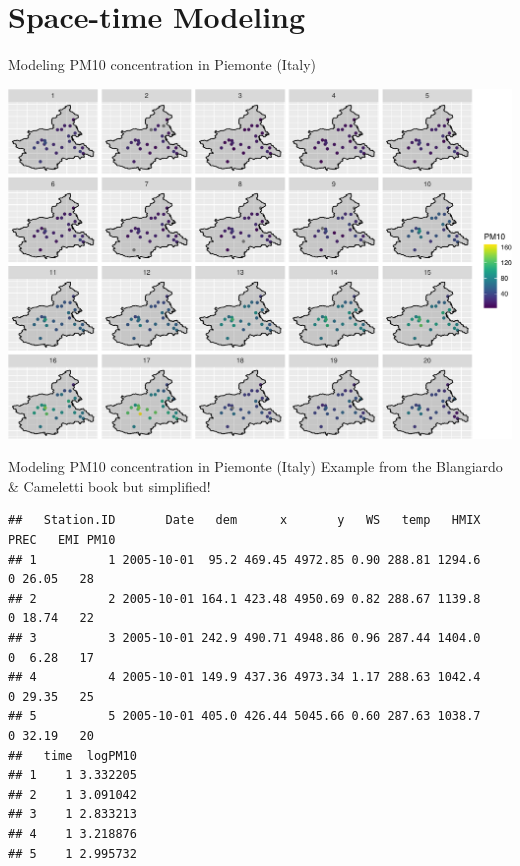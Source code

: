 \documentclass[
  ignorenonframetext,
]{beamer}
\begin{document}
\hypertarget{space-time-modeling}{%
\section{Space-time Modeling}\label{space-time-modeling}}

\begin{frame}{Modeling PM10 concentration in Piemonte (Italy)}
\protect\hypertarget{modeling-pm10-concentration-in-piemonte-italy}{}
\begin{center}\includegraphics[width=0.9\linewidth]{Part3_Spatial_files/figure-beamer/unnamed-chunk-24-1} \end{center}
\end{frame}

\begin{frame}[fragile]{Modeling PM10 concentration in Piemonte (Italy)}
\protect\hypertarget{modeling-pm10-concentration-in-piemonte-italy-1}{}
Example from the Blangiardo \& Cameletti book but simplified! \tiny

\begin{verbatim}
##   Station.ID       Date   dem      x       y   WS   temp   HMIX PREC   EMI PM10
## 1          1 2005-10-01  95.2 469.45 4972.85 0.90 288.81 1294.6    0 26.05   28
## 2          2 2005-10-01 164.1 423.48 4950.69 0.82 288.67 1139.8    0 18.74   22
## 3          3 2005-10-01 242.9 490.71 4948.86 0.96 287.44 1404.0    0  6.28   17
## 4          4 2005-10-01 149.9 437.36 4973.34 1.17 288.63 1042.4    0 29.35   25
## 5          5 2005-10-01 405.0 426.44 5045.66 0.60 287.63 1038.7    0 32.19   20
##   time  logPM10
## 1    1 3.332205
## 2    1 3.091042
## 3    1 2.833213
## 4    1 3.218876
## 5    1 2.995732
\end{verbatim}

\normalsize
\end{frame}
\end{document}
